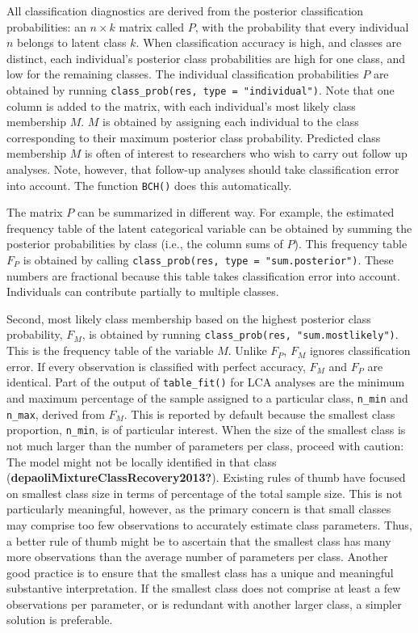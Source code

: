 \documentclass[
  ,man,floatsintext]{apa6}
\begin{document}
All classification diagnostics are derived from the posterior
classification probabilities: an \(n \times k\) matrix called \(P\), with
the probability that every individual \(n\) belongs to latent class \(k\).
When classification accuracy is high, and classes are distinct, each
individual's posterior class probabilities are high for one class, and
low for the remaining classes. The individual classification
probabilities \(P\) are obtained by running
\texttt{class\_prob(res,\ type\ =\ "individual")}. Note that one column is added to
the matrix, with each individual's most likely class membership \(M\). \(M\)
is obtained by assigning each individual to the class corresponding to
their maximum posterior class probability.
Predicted class
membership \(M\) is often of interest to researchers who wish to carry out
follow up analyses. Note, however, that follow-up analyses should take
classification error into account. The function \texttt{BCH()} does this
automatically.

The matrix \(P\) can be summarized in different way. For example, the
estimated frequency table of the latent categorical variable can be
obtained by summing the posterior probabilities by class (i.e., the
column sums of \(P\)). This frequency table \(F_P\) is obtained by calling
\texttt{class\_prob(res,\ type\ =\ "sum.posterior")}. These numbers are fractional
because this table takes classification error into account. Individuals
can contribute partially to multiple classes.

Second, most likely class membership based on the highest posterior
class probability, \(F_M\), is obtained by running
\texttt{class\_prob(res,\ "sum.mostlikely")}. This is the frequency table of the
variable \(M\). Unlike \(F_P\), \(F_M\) ignores classification error. If every
observation is classified with perfect accuracy, \(F_M\) and \(F_P\) are
identical. Part of the output of \texttt{table\_fit()} for LCA analyses are the
minimum and maximum percentage of the sample assigned to a particular
class, \texttt{n\_min} and \texttt{n\_max}, derived from \(F_M\). This is reported by
default because the smallest class proportion, \texttt{n\_min}, is of particular
interest. When the size of the smallest class is not much larger than
the number of parameters per class, proceed with caution: The model
might not be locally identified in that class
(\textbf{depaoliMixtureClassRecovery2013?}). Existing rules of thumb have focused
on smallest class size in terms of percentage of the total sample size.
This is not particularly meaningful, however, as the primary concern is
that small classes may comprise too few observations to accurately
estimate class parameters. Thus, a better rule of thumb might be to
ascertain that the smallest class has many more observations than the
average number of parameters per class. Another good practice is to
ensure that the smallest class has a unique and meaningful substantive
interpretation. If the smallest class does not comprise at least a few
observations per parameter, or is redundant with another larger class, a
simpler solution is preferable.
\end{document}
